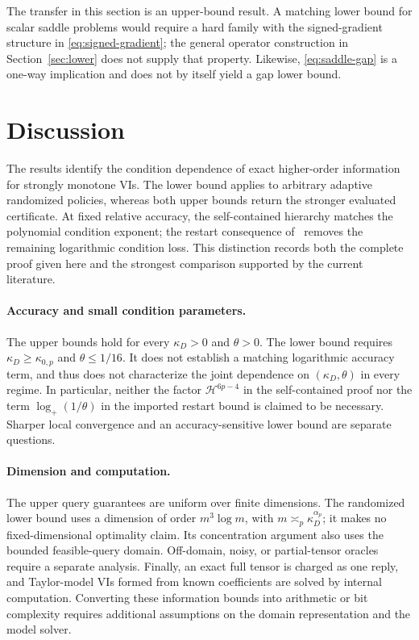 \documentclass[11pt]{article}
\numberwithin{equation}{section}
\theoremstyle{definition}
\theoremstyle{remark}
\newcommand{\ap}{\alpha_p}
\newcommand{\logplus}{\log_{+}}
\begin{document}
The transfer in this section is an upper-bound result. A matching
lower bound for scalar saddle problems would require a hard family
with the signed-gradient structure in \eqref{eq:signed-gradient}; the general
operator construction in Section~\ref{sec:lower} does not supply that
property. Likewise, \eqref{eq:saddle-gap} is a one-way implication
and does not by itself yield a gap lower bound.


\section{Discussion}\label{sec:discussion}
The results identify the condition dependence of exact higher-order
information for strongly monotone VIs. The lower bound applies to
arbitrary adaptive randomized policies, whereas both upper bounds return
the stronger evaluated certificate. At fixed relative accuracy, the
self-contained hierarchy matches the polynomial condition exponent;
the restart consequence of~\cite{zhangchen2026} removes the remaining
logarithmic condition loss. This distinction records both the complete
proof given here and the strongest comparison supported by the current
literature.

\paragraph{Accuracy and small condition parameters.}
The upper bounds hold for every $\kappa_D>0$ and $\theta>0$.
The lower bound requires $\kappa_D\ge\kappa_{0,p}$ and
$\theta\le1/16$. It does not establish a matching logarithmic accuracy
term, and thus does not characterize the joint dependence on
$(\kappa_D,\theta)$ in every regime. In particular, neither the factor
$\mathcal H^{6p-4}$ in the self-contained proof nor the term
$\logplus(1/\theta)$ in the imported restart bound is claimed to be
necessary. Sharper local convergence and an accuracy-sensitive lower
bound are separate questions.

\paragraph{Dimension and computation.}
The upper query guarantees are uniform over finite dimensions. The
randomized lower bound uses a dimension of order $m^3\log m$, with
$m\asymp_p\kappa_D^{\ap}$; it makes no fixed-dimensional optimality
claim. Its concentration argument also uses the bounded feasible-query
domain. Off-domain, noisy, or partial-tensor oracles require a separate
analysis. Finally, an exact full tensor is charged as one reply, and
Taylor-model VIs formed from known coefficients are solved by internal
computation. Converting these information bounds into arithmetic or bit
complexity requires additional assumptions on the domain representation
and the model solver.
\end{document}
